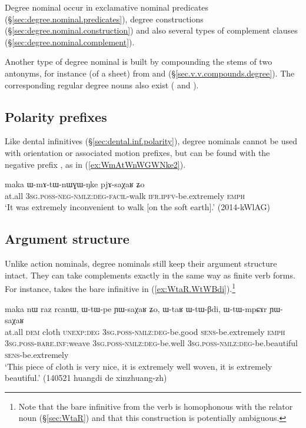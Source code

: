 Degree nominal occur in exclamative nominal predicates (§\ref{sec:degree.nominal.predicates}), degree constructions (§\ref{sec:degree.nominal.construction}) and also several types of complement clauses (§\ref{sec:degree.nominal.complement}).


Another type of degree nominal is built by compounding the stems of two antonyms, for instance  (of a sheet) from  and  (§\ref{sec.v.v.compounds.degree}). The corresponding regular degree nouns also exist ( and ).

\subsection{Polarity prefixes} \label{sec:degree.nominal.prefixes}
Like dental infinitives (§\ref{sec:dental.inf.polarity}), degree nominals cannot be used with orientation or associated motion prefixes, but can be found with the negative prefix , as in (\ref{ex:WmAtWnWGWNke2}).

 \begin{exe}
\ex \label{ex:WmAtWnWGWNke2}
\gll  maka ɯ-mɤ-tɯ-nɯɣɯ-ŋke pjɤ-saχaʁ ʑo \\
at.all \textsc{3sg}.\textsc{poss}-\textsc{neg}-\textsc{nmlz}:\textsc{deg}-\textsc{facil}-walk \textsc{ifr}.\textsc{ipfv}-be.extremely \textsc{emph} \\
\glt `It was extremely inconvenient to walk [on the soft earth].' (2014-kWlAG)
\end{exe}


\subsection{Argument structure} \label{sec:degree.nominal.arguments}
Unlike action nominals, degree nominals still keep their argument structure intact. They can take complements exactly in the same way as finite verb forms. For instance,  takes the bare infinitive  in (\ref{ex:WtaR.WtWBdi}).\footnote{Note that the bare infinitive  from the verb  is homophonous with the relator noun  (§\ref{sec:WtaR}) and that this construction is potentially ambiguous. }

\begin{exe}
\ex \label{ex:WtaR.WtWBdi}
\gll maka nɯ raz rcanɯ, ɯ-tɯ-pe ɲɯ-saχaʁ ʑo, ɯ-taʁ ɯ-tɯ-βdi, ɯ-tɯ-mpɕɤr ɲɯ-saχaʁ \\
at.all \textsc{dem} cloth \textsc{unexp}:\textsc{deg}  \textsc{3sg}.\textsc{poss}-\textsc{nmlz}:\textsc{deg}-be.good \textsc{sens}-be.extremely \textsc{emph} \textsc{3sg}.\textsc{poss}-\textsc{bare}.\textsc{inf}:weave  \textsc{3sg}.\textsc{poss}-\textsc{nmlz}:\textsc{deg}-be.well \textsc{3sg}.\textsc{poss}-\textsc{nmlz}:\textsc{deg}-be.beautiful \textsc{sens}-be.extremely \\
\glt `This piece of cloth is very nice, it is extremely well woven, it is extremely beautiful.' (140521 huangdi de xinzhuang-zh)
\end{exe}

